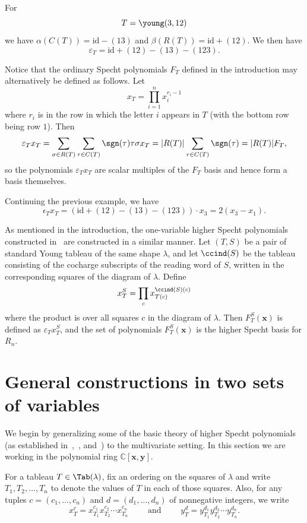 \begin{example}
	For $$T=\young(3,12)$$ we have $\alpha(C(T))=\mathrm{id}-(13)$ and $\beta(R(T))=\mathrm{id}+(12)$.  We then have $$\varepsilon_T=\mathrm{id}+(12)-(13)-(123).$$
\end{example}


Notice that the ordinary Specht polynomials $F_T$ defined in the introduction may alternatively be defined as follows.  Let $$x_T=\prod_{i=1}^n x_i^{r_i-1}$$ where $r_i$ is in the row in which the letter $i$ appears in $T$ (with the bottom row being row $1$).  Then $$\varepsilon_T x_T=\sum_{\sigma\in R(T)}\sum_{\tau\in C(T)}\sgn(\tau)\tau\sigma x_T=|R(T)|\sum_{\tau\in C(T)}\sgn(\tau)=|R(T)|F_T,$$ so the polynomials $\varepsilon_T x_T$ are scalar multiples of the $F_T$ basis and hence form a basis themselves. 

\begin{example}
	Continuing the previous example, we have $$\epsilon_T x_T = (\mathrm{id}+(12)-(13)-(123))\cdot x_3=2(x_3-x_1).$$
\end{example}

As mentioned in the introduction, the one-variable higher Specht polynomials constructed in~\cite{ATY} are constructed in a similar manner.  Let $(T,S)$ be a pair of standard Young tableau of the same shape $\lambda$, and let $\ccind(S)$ be the tableau consisting of the cocharge subscripts of the reading word of $S$, written in the corresponding squares of the diagram of $\lambda$.  Define $$x_T^S=\prod_c x_{T(c)}^{\ccind(S)(c)}$$ where the product is over all squares $c$ in the diagram of $\lambda$.   Then $F_T^S(\mathbf{x})$ is defined as $\varepsilon_T x_T^S$, and the set of polynomials $F_T^S(\mathbf{x})$ is the higher Specht basis for $R_n$.


\section{General constructions in two sets of variables}\label{sec:general}

We begin by generalizing some of the basic theory of higher Specht polynomials (as established in~\cite{AllenOneVariable},~\cite{ATY}, and~\cite{GillespieRhoades}) to the multivariate setting.  In this section we are working in the polynomial ring $\mathbb{C}[\mathbf{x},\mathbf{y}]$.  

For a tableau $T\in \Tab(\lambda)$, fix an ordering on the squares of $\lambda$ and write $T_1,T_2,\ldots,T_n$ to denote the values of $T$ in each of those squares.  Also, for any tuples $c=(c_1,\ldots,c_n)$ and $d=(d_1,\ldots,d_n)$ of nonnegative integers, we write $$x_T^c=x_{T_1}^{c_1} x_{T_2}^{c_2}\cdots x_{T_n}^{c_n}\qquad\text{ and }\qquad y_T^d=y_{T_1}^{d_1} y_{T_2}^{d_2}\cdots y_{T_n}^{d_n}.$$

